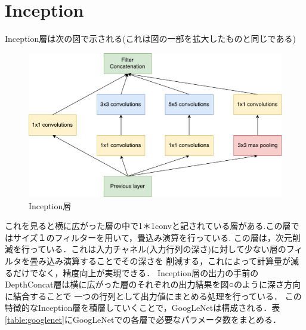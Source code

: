 {\section{Inception}
\label{sec:inception}
Inception層は次の図で示される(これは図の一部を拡大したものと同じである)
\begin{figure}[h]
  \centering
  \includegraphics[scale=0.5]{./chap2/fig/inception.pdf}
  \caption{Inception層}
  \label{fig:inception}
\end{figure}
これを見ると横に広がった層の中で1＊1convと記されている層がある.この層ではサイズ１のフィルターを用いて，畳込み演算を行っている.
この層は，次元削減を行っている．これは入力チャネル(入力行列の深さ)に対して少ない層のフィルタを畳み込み演算することでその深さを
削減する，これによって計算量が減るだけでなく，精度向上が実現できる．
Inception層の出力の手前のDepthConcat層は横に広がった層のそれぞれの出力結果を図○のように深さ方向に結合することで
一つの行列として出力値にまとめる処理を行っている．
この特徴的なInception層を積層していくことで，GoogLeNetは構成される．表\ref{table:googlenet}にGoogLeNetでの各層で必要なパラメータ数をまとめる．

}
